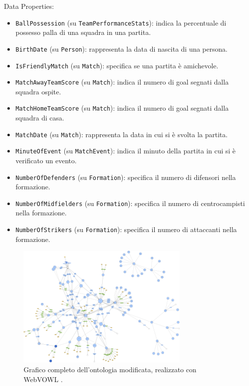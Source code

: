 \documentclass[11pt]{report} %
\begin{document}
\newpage

Data Properties:

\begin{itemize}
    \item \texttt{BallPossession} (su \texttt{TeamPerformanceStats}): indica la percentuale di possesso palla di una squadra in una partita.
    \item \texttt{BirthDate} (su \texttt{Person}): rappresenta la data di nascita di una persona.
    \item \texttt{IsFriendlyMatch} (su \texttt{Match}): specifica se una partita è amichevole.
    \item \texttt{MatchAwayTeamScore} (su \texttt{Match}): indica il numero di goal segnati dalla squadra ospite.
    \item \texttt{MatchHomeTeamScore} (su \texttt{Match}): indica il numero di goal segnati dalla squadra di casa.
    \item \texttt{MatchDate} (su \texttt{Match}): rappresenta la data in cui si è svolta la partita.
    \item \texttt{MinuteOfEvent} (su \texttt{MatchEvent}): indica il minuto della partita in cui si è verificato un evento.
    \item \texttt{NumberOfDefenders} (su \texttt{Formation}): specifica il numero di difensori nella formazione.
    \item \texttt{NumberOfMidfielders} (su \texttt{Formation}): specifica il numero di centrocampisti nella formazione.
    \item \texttt{NumberOfStrikers} (su \texttt{Formation}): specifica il numero di attaccanti nella formazione.
\end{itemize}

\begin{figure}[H]
    \begin{center}
        \includegraphics[width=0.75\textwidth]{FootOntologyPlus.rdf.png}
    \end{center}
    \caption{Grafico completo dell'ontologia modificata, realizzato con WebVOWL \cite{webvowl,foot}.}
\end{figure}
\end{document}
